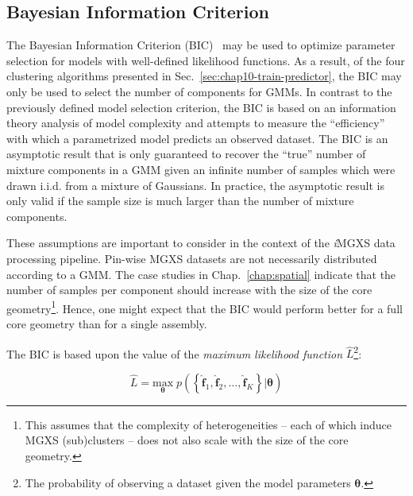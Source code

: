 \subsection{Bayesian Information Criterion}
\label{subsec:chap10-bic}

The Bayesian Information Criterion (BIC)~\cite{schwarz1978bic} may be used to optimize parameter selection for models with well-defined likelihood functions. As a result, of the four clustering algorithms presented in Sec.~\ref{sec:chap10-train-predictor}, the BIC may only be used to select the number of components for \acp{GMM}. In contrast to the previously defined model selection criterion, the BIC is based on an information theory analysis of model complexity and attempts to measure the ``efficiency'' with which a parametrized model predicts an observed dataset. The BIC is an asymptotic result that is only guaranteed to recover the ``true'' number of mixture components in a \ac{GMM} given an infinite number of samples which were drawn i.i.d. from a mixture of Gaussians. In practice, the asymptotic result is only valid if the sample size is much larger than the number of mixture components. 

These assumptions are important to consider in the context of the \textit{i}\ac{MGXS} data processing pipeline. Pin-wise \ac{MGXS} datasets are not necessarily distributed according to a \ac{GMM}. The case studies in Chap.~\ref{chap:spatial} indicate that the number of samples per component should increase with the size of the core geometry\footnote{This assumes that the complexity of heterogeneities -- each of which induce \ac{MGXS} (sub)clusters -- does not also scale with the size of the core geometry.}. Hence, one might expect that the BIC would perform better for a full core geometry than for a single assembly.


The BIC is based upon the value of the \textit{maximum likelihood function} $\hat{L}$\footnote{The probability of observing a dataset given the model parameters $\boldsymbol{\theta}$.}:

\begin{equation}
\label{eqn:chap10-likelihood}
\hat{L} = \underset{\boldsymbol{\theta}}{\textrm{max}} \; p \left( \left\{ \boldsymbol{\hat{f}}_{1}, \boldsymbol{\hat{f}}_{2}, \dots, \boldsymbol{\hat{f}}_{K} \right\} | \boldsymbol{\theta}\right)
\end{equation}

